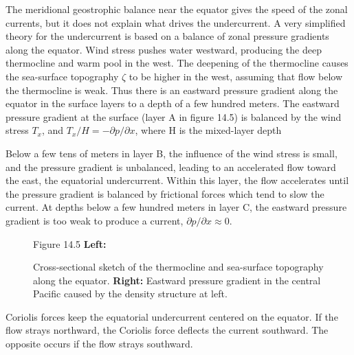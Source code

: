 The meridional geostrophic balance near the equator gives the speed of
the zonal currents, but it does not explain what drives the
undercurrent. A very simplified theory for the undercurrent is based
on a balance of zonal pressure gradients along the equator. Wind
stress pushes water westward, producing the deep
thermocline and warm pool in the west. The
deepening of the thermocline causes the
sea-surface topography $\zeta$ to be higher in the west, assuming that
flow below the thermocline is weak. Thus there is an eastward pressure
gradient along the equator in the surface layers to a depth of a few
hundred meters. The eastward pressure gradient at the surface (layer A
in figure 14.5) is balanced by the wind stress $T_x $, and $T_x / H = -\partial p/\partial x$,
where H is the mixed-layer depth

Below a few tens of meters in layer B, the influence of the wind
stress is small, and the pressure gradient is unbalanced, leading to
an accelerated flow toward the east, the equatorial
undercurrent. Within this layer, the flow accelerates until the
pressure gradient is balanced by frictional forces which tend to slow
the current. At depths below a few hundred meters in layer C, the
eastward pressure gradient is too weak to produce a current,
$\partial p / \partial x \approx 0$.

\begin{figure}[t!]
\footnotesize
Figure 14.5 \textbf{Left:} \rule{0pt}{3ex}Cross-sectional sketch of
the thermocline and sea-surface
topography along the equator.  \textbf{Right:} Eastward pressure
gradient in the central Pacific caused by the density structure at
left.
\label{fig:equatorsketch}
\vspace{-4ex}
\end{figure}

Coriolis forces keep the equatorial undercurrent centered on the
equator. If the flow strays northward, the Coriolis force deflects the
current southward.  The opposite occurs if the flow strays southward.

